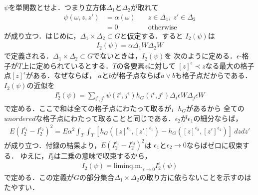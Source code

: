 	$\psi$を単関数とせよ．つまり立方体$\Delta_{1}$と$\Delta_{2}$が取れて
	\begin{align}
		\psi(\omega,z,z') 
		&= \alpha(\omega) \quad & z \in \Delta_{1},\ z' \in \Delta_{2} \\
		&= 0 \quad & \mbox{otherwise}
	\end{align}
	が成り立つ．はじめに，$\Delta_{1} \times \Delta_{2} \subset G$と仮定する．すると
	$I_{2}(\psi)$は
	\begin{align}
		I_{2}(\psi) = \alpha \Delta_{1}W \Delta_{2} W
	\end{align}
	で定義される．$\Delta_{1} \times \Delta_{2} \subset G$でないときは，$I_{2}(\psi)$を
	次のように定める．$\epsilon$-格子が$T$上に定められているとする．$T$の各要素$z$に対して
	$[z]^{\epsilon} \prec z$なる最大の格子点$[z]^{\epsilon}$がある．なぜならば，
	$a$と$b$が格子点ならば$a \vee b$も格子点だからである．$I_{2}(\psi)$の近似を
	\begin{align}
		I^{\epsilon}_{2}(\psi) = \sum_{i^{\epsilon},j^{\epsilon}}
		\psi(i^{\epsilon},j^{\epsilon}) h_{G}(i^{\epsilon},j^{\epsilon})
		\Delta_{i} \epsilon W \Delta_{j} \epsilon W
	\end{align}
	で定める．ここで和は全ての格子点にわたって取るが，$h_{G}$があるから
	全ての$unordered$な格子点にわたって取ることと同じである．$\epsilon_{2}$が$\epsilon_{1}$の細分ならば，
	\begin{align}
		E(I^{\epsilon_{1}}_{2} - I^{\epsilon_{2}}_{2})^{2}
		= E \alpha^{2} \int_{T} \int_{T} \left[
		h_{G}([z]^{\epsilon_{1}}, [z']^{\epsilon_{1}})
		- h_{G}([z]^{\epsilon_{2}}, [z']^{\epsilon_{2}})\right]\ dzdz'
	\end{align}
	が成り立つ．付録の結果より，$E(I^{\epsilon_{1}}_{2} - I^{\epsilon_{2}}_{2})^{2}$は
	$\epsilon_{1}$と$\epsilon_{2} \longrightarrow 0$ならばゼロに収束する．
	ゆえに，$I^{\epsilon}_{2}$は二乗の意味で収束するから，
	\begin{align}
		I_{2}(\psi) = \mathrm{lim in q.m.}_{\epsilon \to 0} I^{\epsilon}_{2}(\psi)
	\end{align}
	で定める．この定義が$G$の部分集合$\Delta_{1} \times \Delta_{2}$の取り方に依らないことを示すのは
	たやすい．
	
